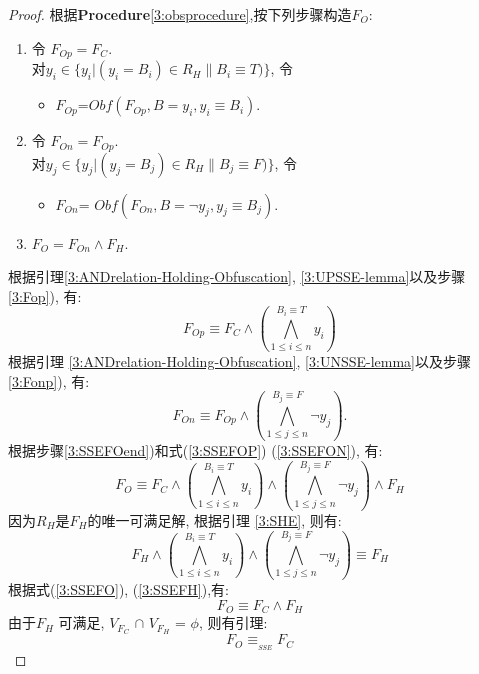 \begin{proof}
根据\textbf{Procedure}\ref{3:obsprocedure},按下列步骤构造$F_O$:
\begin{enumerate}
\item \label{3:Fop}
令 $F_{Op}=F_C$.  \\
对$y_i \in \{y_i|(y_i=B_{i})\in R_H \parallel B_i\equiv T)\}$, 令
\begin{itemize}
 \item[] $F_{Op}$=$Obf(F_{Op},B=y_i,{y_i\equiv B_i})$.
\end{itemize}
\item  \label{3:Fonp}
令 $F_{On}=F_{Op}$. \\
对$y_j \in \{y_j|(y_j=B_j)\in R_H \parallel B_j\equiv F)\}$, 令
\begin{itemize}
 \item[] $F_{On}$= $Obf(F_{On},B=\neg y_j,{y_j\equiv B_j})$.
\end{itemize}
\item  \label{3:SSEFOend}
$F_{O}=F_{On}\wedge F_H$.
\end{enumerate}
根据引理\ref{3:ANDrelation-Holding-Obfuscation}, \ref{3:UPSSE-lemma}以及步骤\ref{3:Fop}), 有:
\begin{equation}\label{3:SSEFOP}
F_{Op} \equiv F_C\wedge (\bigwedge_{1\leqslant i\leqslant n}^{B_i \equiv T}y_i)
\end{equation}
根据引理 \ref{3:ANDrelation-Holding-Obfuscation}, \ref{3:UNSSE-lemma}以及步骤\ref{3:Fonp}), 有:
\begin{equation}\label{3:SSEFON}
F_{On} \equiv F_{Op}\wedge (\bigwedge_{1\leqslant j\leqslant n}^{B_j \equiv F}\neg y_j).
\end{equation}
根据步骤\ref{3:SSEFOend})和式(\ref{3:SSEFOP}) (\ref{3:SSEFON}), 有:
\begin{equation}\label{3:SSEFO}
F_{O} \equiv F_C \wedge
(\bigwedge_{1\leqslant i\leqslant n}^{B_i \equiv T}y_i)\wedge
(\bigwedge_{1\leqslant j\leqslant n}^{B_j \equiv F}\neg y_j) \wedge F_H
\end{equation}
因为${R_H}$是$F_H$的唯一可满足解,
根据引理 \ref{3:SHE}, 则有:
\begin{equation}\label{3:SSEFH}
F_H \wedge (\bigwedge_{1\leqslant i\leqslant n}^{B_i \equiv T}y_i)\wedge
(\bigwedge_{1\leqslant j\leqslant n}^{B_j\equiv F}\neg y_j)\equiv F_H
\end{equation}
根据式(\ref{3:SSEFO}), (\ref{3:SSEFH}),有:
\begin{equation}\label{3:SSEEND}
F_O\equiv F_C \wedge F_H
\end{equation}
由于$F_H$ 可满足, $V_{F_C}$ $\cap$ $V_{F_H}$ = $\phi$, 则有引理:
\begin{equation}
F_O\equiv_{_{SSE}}  F_C
\end{equation}
\end{proof}

